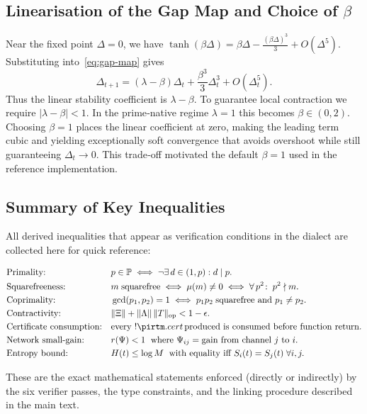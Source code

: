 \documentclass[11pt]{article}
\begin{document}
\subsection{Linearisation of the Gap Map and Choice of $\beta$}
Near the fixed point $\Delta=0$, we have $\tanh(\beta\Delta)=\beta\Delta-\frac{(\beta\Delta)^3}{3}+O(\Delta^5)$. Substituting into~\eqref{eq:gap-map} gives
\[
    \Delta_{t+1}=(\lambda-\beta)\Delta_t+\frac{\beta^3}{3}\Delta_t^3+O(\Delta_t^5).
\tag{3}
\]
Thus the linear stability coefficient is $\lambda-\beta$. To guarantee local contraction we require $|\lambda-\beta|<1$.  In the prime‑native regime $\lambda=1$ this becomes $\beta\in(0,2)$.  Choosing $\beta=1$ places the linear coefficient at zero, making the leading term cubic and yielding exceptionally soft convergence that avoids overshoot while still guaranteeing $\Delta_t\to0$.  This trade‑off motivated the default $\beta=1$ used in the reference implementation.

\subsection{Summary of Key Inequalities}
All derived inequalities that appear as verification conditions in the dialect are collected here for quick reference:

\begin{align}
    &\text{Primality:} && p\in\mathbb{P} \;\Longleftrightarrow\; \neg\exists\,d\in(1,p): d\mid p.\\
    &\text{Squarefreeness:} && m\;\text{squarefree}\;\Longleftrightarrow\; \mu(m)\neq0\;\Longleftrightarrow\; \forall\,p^2\!:\; p^2\nmid m.\\
    &\text{Coprimality:} && \gcd(p_1,p_2)=1\;\Longleftrightarrow\; p_1p_2\;\text{squarefree and }p_1\neq p_2.\\
    &\text{Contractivity:} && \|\Xi\|+\|\Lambda\|\,\|T\|_{\mathrm{op}}<1-\epsilon.\\
    &\text{Certificate consumption:} && \text{every }!\pirtm.cert\!\text{ produced is consumed before function return.}\\
    &\text{Network small‑gain:} && r(\Psi)<1\;\text{ where }\Psi_{ij}=\text{gain from channel }j\text{ to }i.\\
    &\text{Entropy bound:} && H(t)\le\log M\;\text{ with equality iff }S_i(t)=S_j(t)\;\forall i,j.\\
\end{align}

These are the exact mathematical statements enforced (directly or indirectly) by the six verifier passes, the type constraints, and the linking procedure described in the main text.

\nocite{*}
  

\end{document}
